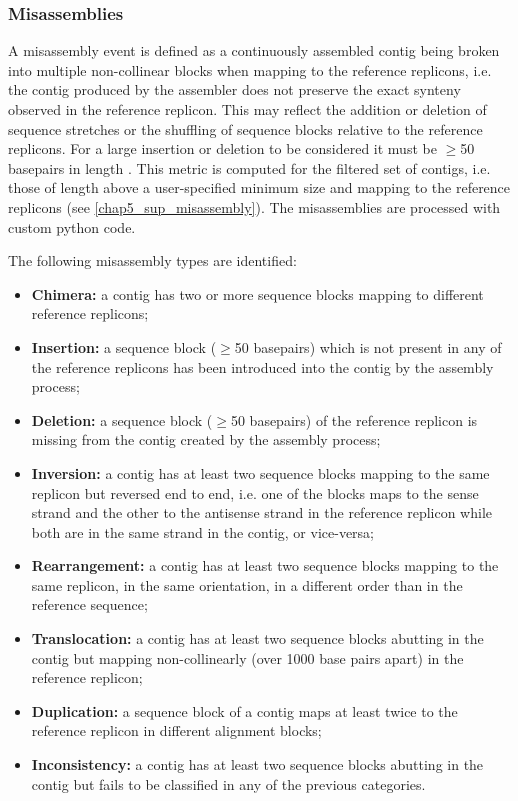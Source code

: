 \subsubsection{Misassemblies}

A misassembly event is defined as a continuously assembled contig being broken into multiple non-collinear blocks when mapping to the reference replicons, i.e. the contig produced by the assembler does not preserve the exact synteny observed in the reference replicon. This may reflect the addition or deletion of sequence stretches or the shuffling of sequence blocks relative to the reference replicons. For a large insertion or deletion to be considered it must be $\geq $50 basepairs in length \cite{kosugi_comprehensive_2019}. This metric is computed for the filtered set of contigs, i.e. those of length above a user-specified minimum size and mapping to the reference replicons (see \ref{chap5_sup_misassembly}). The misassemblies are processed with custom python code. 

The following misassembly types are identified:

\begin{itemize}
    \item \textbf{Chimera:} a contig has two or more sequence blocks mapping to different reference replicons;
    \item \textbf{Insertion:} a sequence block ($\geq $50 basepairs) which is not present in any of the reference replicons has been introduced into the contig by the assembly process;
    \item \textbf{Deletion:} a sequence block ($\geq $50 basepairs) of the reference replicon is missing from the contig created by the assembly process;
    \item \textbf{Inversion:} a contig has at least two sequence blocks mapping to the same replicon but reversed end to end, i.e. one of the blocks maps to the sense strand and the other to the antisense strand in the reference replicon while both are in the same strand in the contig, or vice-versa;
    \item \textbf{Rearrangement:} a contig has at least two sequence blocks mapping to the same replicon, in the same orientation, in a different order than in the reference sequence;
    \item \textbf{Translocation:} a contig has at least two sequence blocks abutting in the contig but mapping non-collinearly (over 1000 base pairs apart) in the reference replicon;
    \item \textbf{Duplication:} a sequence block of a contig maps at least twice to the reference replicon in different alignment blocks;
    \item \textbf{Inconsistency:} a contig has at least two sequence blocks abutting in the contig but fails to be classified in any of the previous categories.
\end{itemize}

